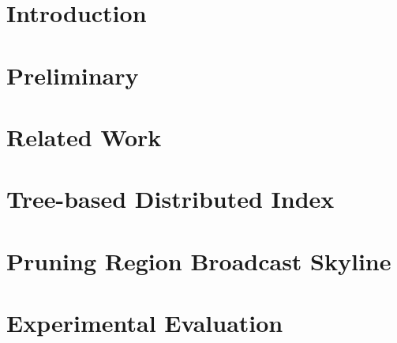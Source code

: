 
\section{Introduction}\label{sec-intro}


\section{Preliminary}\label{sec-prelim}


\section{Related Work}\label{sec-related}


\section{Tree-based Distributed Index}\label{sec-index}


\section{Pruning Region Broadcast Skyline}\label{sec-pruning}


\section{Experimental Evaluation}\label{sec-exp}


%

%



%
%

%

